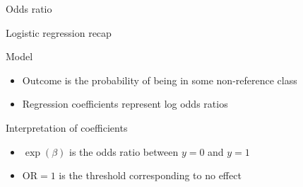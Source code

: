 \begin{frame}[t]{Odds ratio}
\end{frame}

\begin{frame}{Logistic regression recap}
    \begin{block}{Model}
        \begin{itemize}
            \item Outcome is the \alert{probability} of being in some
                  non\hyp{}reference class
            \item Regression coefficients represent \alert{log odds ratios}
        \end{itemize}
    \end{block}
    \vfill
    \begin{block}{Interpretation of coefficients}
        \begin{itemize}
            \item $\exp\!\left( \beta \right)$ is the \alert{odds ratio} between
                  $y = 0$ and $y = 1$
            \item $\text{OR} = 1$ is the threshold corresponding to no effect
        \end{itemize}
    \end{block}
\end{frame}



